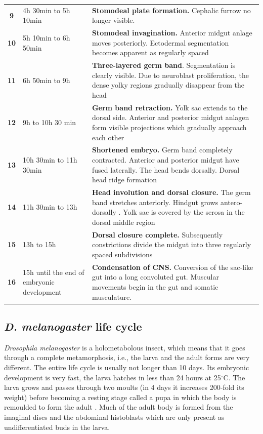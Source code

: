\begin{table}
\begin{tabular}{|c|p{3.5cm}|p{14cm}|}
%
\textbf{9}	& 4h 30min to 5h 10min	& \textbf{Stomodeal plate formation.} Cephalic furrow no longer visible. 	 	\\
%
\textbf{10}	& 5h 10min to 6h 50min	& \textbf{Stomodeal invagination.} Anterior midgut anlage moves posteriorly. Ectodermal segmentation becomes apparent as regularly spaced	\\
%
\textbf{11}	& 6h 50min to 9h 	& \textbf{Three-layered germ band}. Segmentation is clearly visible. Due to neuroblast proliferation, the dense yolky regions gradually disappear from the head	\\
%
\textbf{12}	& 9h to 10h 30 min	& \textbf{Germ band retraction.} Yolk sac extends to the dorsal side. Anterior and posterior midgut anlagen form visible projections which gradually approach each other	\\
%
\textbf{13}	& 10h 30min to 11h 30min	& \textbf{Shortened embryo.} Germ band completely contracted. Anterior and posterior midgut have fused laterally. The head bends dorsally. Dorsal head ridge formation \\
%
\textbf{14}	& 11h 30min to 13h	& \textbf{Head involution and dorsal closure.} The germ band stretches anteriorly. Hindgut grows antero-dorsally	. Yolk sac is covered by the serosa in the dorsal middle region\\
%
\textbf{15}	& 13h to 15h 	& \textbf{Dorsal closure complete.} Subsequently constrictions divide the midgut into three regularly spaced subdivisions	\\
%
\textbf{16}	& 15h until the end of embryonic development	& \textbf{Condensation of CNS.} Conversion of the sac-like gut into a long convoluted gut. Muscular movements begin in the gut and somatic musculature. 	\\
\hline
\end{tabular}
\end{table}

\subsection{\textit{D. melanogaster} life cycle}

\textit{Drosophila melanogaster} is a holometabolous insect, which means that it goes through a complete metamorphosis, i.e., the larva and the adult forms are very different. The entire life cycle is usually not longer than 10 days. Its embryonic development is very fast, the larva hatches in less than 24 hours at 25$^\circ$C. The larva grows and passes through two moults (in 4 days it increases 200-fold its weight) before becoming a resting stage called a pupa in which the body is remoulded to form the adult \citep{Stocker2008}.
Much of the adult body is formed from the imaginal discs and the abdominal histoblasts which are only present as undifferentiated buds in the larva.

